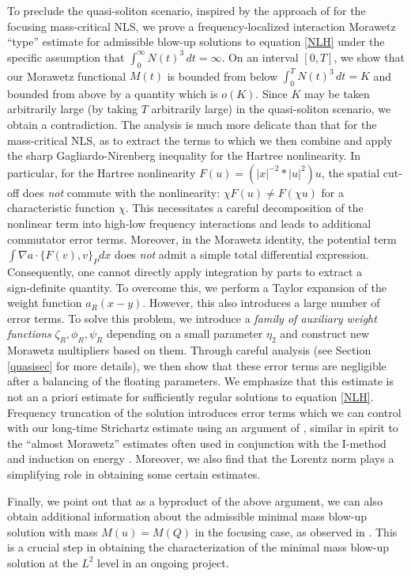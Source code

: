 \documentclass[reqno,11pt]{amsart}
\theoremstyle{plain}
\theoremstyle{definition}
\numberwithin{equation}{section}
\numberwithin{theorem}{section}
\begin{document}
To preclude the quasi-soliton scenario, inspired by the approach of \cite{Dodson-Adv} for the focusing mass-critical NLS, we prove a frequency-localized interaction Morawetz ``type'' estimate for admissible blow-up solutions to equation \eqref{NLH} under the specific assumption that $\int_0^\infty N(t)^3 \, dt = \infty$. On an interval $[0, T]$, we show that our Morawetz functional $M(t)$ is bounded from below $\int_0^T N(t)^3 \, dt = K$ and bounded from above by a quantity which is $o(K)$. Since $K$ may be taken arbitrarily large (by taking $T$ arbitrarily large) in the quasi-soliton scenario, we obtain a contradiction. The analysis is much more delicate than that for the mass-critical NLS, as to extract the terms to which we then combine and apply the sharp Gagliardo-Nirenberg inequality for the Hartree nonlinearity. In particular, for the Hartree nonlinearity $F(u) = (|x|^{-2} * |u|^2)u$, the spatial cut-off does \emph{not} commute with the nonlinearity: $\chi F(u) \neq F(\chi u)$ for a characteristic function $\chi$. This necessitates a careful decomposition of the nonlinear term into high‑low frequency interactions and leads to additional commutator error terms. Moreover, in the Morawetz identity, the potential term $\int \nabla a \cdot \{F(v),v\}_P dx$ does \emph{not} admit a simple total differential expression. Consequently, one cannot directly apply integration by parts to extract a sign‑definite quantity. To overcome this, we perform a Taylor expansion of the weight function $a_R(x-y)$. However, this also introduces a large number of error terms. To solve this problem, we introduce a \emph{family of auxiliary weight functions} $\zeta_R, \phi_R, \psi_R$ depending on a small parameter $\eta_2$ and construct new Morawetz multipliers based on them. Through careful analysis (see Section \ref{quasisec} for more details), we then show that these error terms are negligible after a balancing of the floating parameters. We emphasize that this estimate is not an a priori estimate for sufficiently regular solutions to equation \eqref{NLH}. Frequency truncation of the solution introduces error terms which we can control with our long-time Strichartz estimate using an argument of \cite{Dodson-JAMS}, similar in spirit to the ``almost Morawetz'' estimates often used in conjunction with the I-method \cite{Iteam} and induction on energy \cite{Iteam2}. Moreover, we also find that the Lorentz norm plays a simplifying role in obtaining some certain estimates.

Finally, we point out that as a byproduct of the above argument, we can also obtain additional information about the admissible minimal mass blow-up solution  with mass $M(u) = M(Q)$ in the focusing case, as observed in \cite{Dodson-SIAM,Dodson-NA,F}. This is a crucial step in obtaining the characterization of the minimal mass blow-up solution at the $L^2$ level in an ongoing project.
\end{document}
